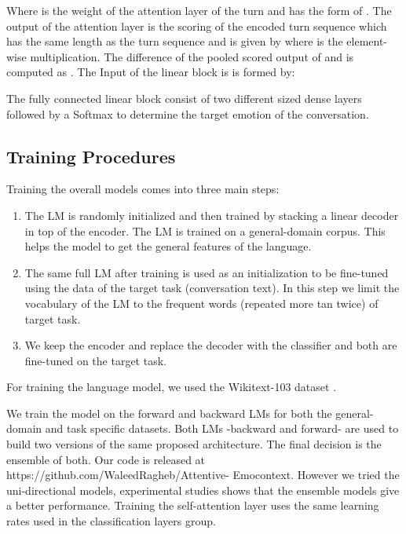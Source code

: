 \documentclass{article}
\begin{document}
Where  is the weight of the attention layer of the  turn and  has the form of . The output of the attention layer is the scoring of the encoded turn sequence  which has the same length as the turn sequence and is given by 
where  is the element-wise multiplication. The difference of the pooled scored output of  and  is computed as . The Input of the linear block is  is formed by:



The fully connected linear block consist of two different sized dense layers followed by a Softmax to determine the target emotion of the conversation. 

\subsection{Training Procedures}
Training the overall models comes into three main steps:
\begin{enumerate}
\item The LM is randomly initialized and then trained by stacking a linear decoder in top of the encoder. The LM is trained on a general-domain corpus. This helps the model to get the general features of the language.
\item The same full LM after training is used as an initialization to be fine-tuned using the data of the target task (conversation text). In this step we limit the vocabulary of the LM to the frequent words (repeated more tan twice) of target task.
\item We keep the encoder and replace the decoder with the classifier and both are fine-tuned on the target task.\end{enumerate}

For training the language model, we used the Wikitext-103 dataset \cite{wiki}.
\begin{comment}With more than 28K of Wikipedia articles and 103 million words, the model determine the main structure and hierarchy of the language by sequence-to-sequence modeling. The training of the architecture is done using  slanted triangular learning rates (STLR) which change the learning rate for each iteration in triangular fashion. we used only once cycle as recommend in \cite{jerm}. The model was trained by discriminative fine-tuning which uses different learning rate for each layer group. The model is trained gradually by freezing and unfreezing layers for different groups. 
\end{comment}
We train the model on the forward and backward LMs for both the general-domain and task specific datasets. Both LMs -backward and forward- are used to build two versions of the same proposed architecture. The final decision is the ensemble of both.  Our code is released at https://github.com/WaleedRagheb/Attentive- Emocontext. However we tried the uni-directional models, experimental studies shows that the ensemble models give a better performance. Training the self-attention layer uses the same learning rates used in the classification layers group.
\end{document}
